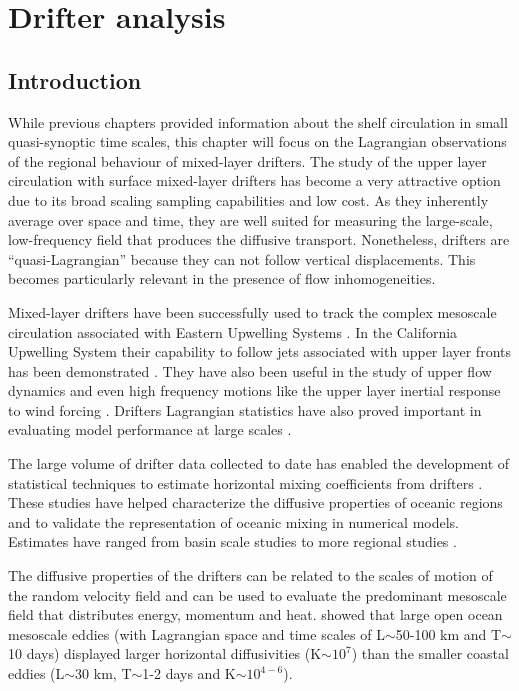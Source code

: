 \chapter{Drifter analysis}\label{ch:drifters}
\section{Introduction}

While previous chapters provided information about the shelf
circulation in small quasi-synoptic time scales, this chapter will
focus on the Lagrangian observations of the regional behaviour of
mixed-layer drifters. The study of the upper layer circulation
with surface mixed-layer drifters has become a very attractive
option due to its broad scaling sampling capabilities and low
cost. As they inherently average over space and time, they are
well suited for measuring the large-scale, low-frequency field
that produces the diffusive transport. Nonetheless, drifters are
``quasi-Lagrangian'' because they can not follow vertical
displacements. This becomes particularly relevant in the presence
of flow inhomogeneities.

Mixed-layer drifters have been successfully used to track the
complex mesoscale circulation associated with Eastern Upwelling
Systems \citep{Brink91b,Brink00}. In the California Upwelling
System their capability to follow jets associated with upper layer
fronts has been demonstrated \citep[e.g.][]{Swenson92}. They have
also been useful in the study of upper flow dynamics
\citep[e.g.][]{Flament00} and even high frequency motions like the
upper layer inertial response to wind forcing \citep{Poulain90}.
Drifters Lagrangian statistics have also proved important in
evaluating model performance at large scales \citep{McClean02}.

The large volume of drifter data collected to date has enabled the
development of statistical techniques to estimate horizontal
mixing coefficients from drifters \citep[e.g.][]{Colin83,Davis85}.
These studies have helped characterize the diffusive properties of
oceanic regions and to validate the representation of oceanic
mixing in numerical models. Estimates have ranged from basin scale
studies \citep[e.g.][]{Fratantoni01} to more regional studies
\citep{Dever98,Poulain01}.

The diffusive properties of the drifters can  be related to the
scales of motion of the random velocity field \citep{Swenson96}
and can be used to evaluate the predominant mesoscale field that
distributes energy, momentum and heat. \citet{Davis85} showed that
large open ocean mesoscale eddies (with Lagrangian space and time
scales of L$\sim$50-100 km and T$\sim$10 days) displayed larger
horizontal diffusivities (K$\sim 10^7$\mixc) than the smaller
coastal eddies (L$\sim$30 km, T$\sim$1-2 days and K$\sim
10^{4-6}$\mixc).

